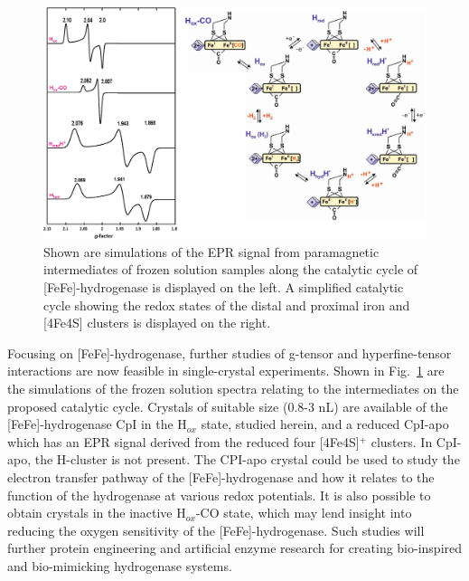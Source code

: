 \begin{figure}[htbp]
\centering
 \includegraphics[width=\textwidth]{Kapitel/end-images/Ch6-EPRCat.eps}
 \caption[EPR Signals along the catalytic cycle of FeFe-Hydrogenase.]{Shown are simulations of the EPR signal from paramagnetic intermediates of frozen solution samples along the catalytic cycle of [FeFe]-hydrogenase is displayed on the left. A simplified catalytic cycle showing the redox states of the distal and proximal iron and [4Fe4S] clusters is displayed on the right.} 
 \label{fig:FeFeCatCycle}
\end{figure}

Focusing on [FeFe]-hydrogenase, further studies of g-tensor and hyperfine-tensor interactions are now feasible in single-crystal experiments. Shown in Fig.~\ref{fig:FeFeCatCycle} are the simulations of the frozen solution spectra relating to the intermediates on the proposed catalytic cycle. \cite{lubitzhyd} Crystals of suitable size (0.8-3 nL) are available of the [FeFe]-hydrogenase CpI in the H$_{ox}$ state, studied herein, and a reduced CpI-apo which has an EPR signal derived from the reduced four [4Fe4S]$^+$ clusters. In CpI-apo, the H-cluster is not present. The CPI-apo crystal could be used to study the electron transfer pathway of the [FeFe]-hydrogenase and how it relates to the function of the hydrogenase at various redox potentials. It is also possible to obtain crystals in the inactive H$_{ox}$-CO state, which may lend insight into reducing the oxygen sensitivity of the [FeFe]-hydrogenase. Such studies will further protein engineering and artificial enzyme research for creating bio-inspired and bio-mimicking hydrogenase systems. \cite{C7SE00582B}


{\renewcommand{\bibsection}{\clearpage\section*{\bibname}\markboth{\bibname}{\bibname}}
\renewcommand{\bibname}{REFERENCES}


}